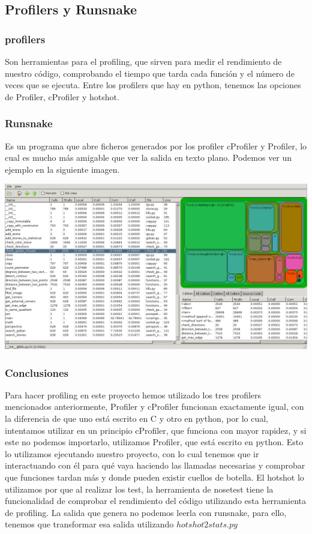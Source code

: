\documentclass[12pt,a4papert,woside,openright,titlepage,final]{book}
\begin{document}
\subsection{Profilers y Runsnake}

\subsubsection{profilers} 

Son herramientas para el profiling, que sirven para medir el rendimiento de
nuestro código, comprobando el tiempo que tarda cada función y el número de
veces que se ejecuta. Entre los profilers que hay en python, tenemos las
opciones de Profiler, cProfiler y hotshot.


\subsubsection{Runsnake} 

Es un programa que abre ficheros generados por los profiler cProfiler y
Profiler, lo cual es mucho más amigable que ver la salida en texto plano.
Podemos ver un ejemplo en la siguiente imagen. 

\includegraphics[scale=0.33]{runsnake.png}

\subsubsection{Conclusiones}

Para hacer profiling en este proyecto hemos utilizado los tres profilers
mencionados anteriormente, Profiler y cProfiler funcionan exactamente igual, con
la diferencia de que uno está escrito en C y otro en python, por lo cual,
intentamos utilizar en un principio cProfiler, que funciona con mayor rapidez, y
si este no podemos importarlo, utilizamos Profiler, que está escrito en
python. Esto lo utilizamos ejecutando nuestro proyecto, con lo cual tenemos que
ir interactuando con él para qué vaya haciendo las llamadas necesarias y
comprobar que funciones tardan más y donde pueden existir cuellos de botella. 
El hotshot lo utilizamos por que al realizar los test, la herramienta de
nosetest tiene la funcionalidad de comprobar el rendimiento del código
utilizando esta herramienta de profiling. La salida que genera no podemos leerla
con runsnake, para ello, tenemos que transformar esa salida utilizando
$hotshot2stats.py$
\end{document}
